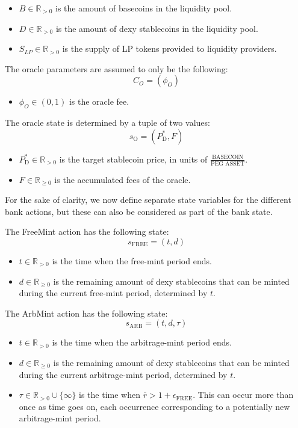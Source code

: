 \documentclass{ifcolog}
\newcommand{\Pdt}{P_{\mathrm{D}}^{*}}
\newcommand{\rr}{\bar{r}}
\begin{document}
\begin{itemize}
  \item $B \in \mathbb{R}_{>0}$ is the amount of basecoins in the liquidity pool.
  \item $D \in \mathbb{R}_{>0}$ is the amount of dexy stablecoins in the liquidity pool.
  \item $S_{LP} \in \mathbb{R}_{>0}$ is the supply of LP tokens provided to liquidity providers.
\end{itemize}

The oracle parameters are assumed to only be the following:
$$C_{O} = \left(\phi_{O}\right)$$

\begin{itemize}
  \item $\phi_{O} \in (0,1)$ is the oracle fee.
\end{itemize}

The oracle state is determined by a tuple of two values:
$$s_{\textrm{O}} = \left(\Pdt, F \right)$$

\begin{itemize}
  \item $\Pdt \in \mathbb{R}_{>0}$ is the target stablecoin price, in units of $\frac{\textrm{BASECOIN}}{\textrm{PEG ASSET}}$.
  \item $F \in \mathbb{R}_{\ge 0}$ is the accumulated fees of the oracle.
\end{itemize}

For the sake of clarity, we now define separate state variables for the different bank actions, 
but these can also be considered as part of the bank state.

The FreeMint action has the following state:
$$s_{\textrm{FREE}} = \left( t, d \right)$$

\begin{itemize}
  \item $t \in \mathbb{R}_{>0}$ is the time when the free-mint period ends.
  \item $d \in \mathbb{R}_{\ge0}$ is the remaining amount of dexy stablecoins that can be minted during the current free-mint period, determined by $t$.
\end{itemize}

The ArbMint action has the following state:
$$s_{\textrm{ARB}} = \left(t, d, \tau\right)$$

\begin{itemize}
  \item $t \in \mathbb{R}_{>0}$ is the time when the arbitrage-mint period ends.
  \item $d \in \mathbb{R}_{\ge 0}$ is the remaining amount of dexy stablecoins that can be minted during the current arbitrage-mint period, determined by $t$.
  \item $\tau \in \mathbb{R}_{>0}\cup\{\infty\}$ is the time when $\rr > 1 + \epsilon_{\textrm{FREE}}$. This can occur more than once as time goes on,
        each occurrence corresponding to a potentially new arbitrage-mint period. 
\end{itemize}
\end{document}
